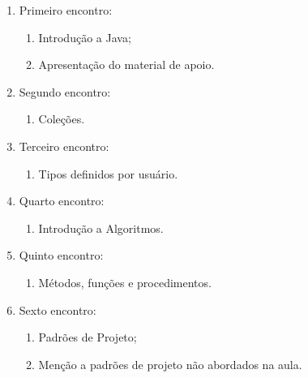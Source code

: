 \documentclass{article}
\begin{document}
\begin{enumerate}[label= (\alph*)]
    \item Primeiro encontro:
        \begin{samepage}
            \begin{enumerate}
                \item Introdução a Java;
                \item Apresentação do material de apoio.
            \end{enumerate}
        \end{samepage}
    \item Segundo encontro:
        \begin{samepage}
            \begin{enumerate}
                \item Coleções.
            \end{enumerate}
        \end{samepage}
    \item Terceiro encontro:
        \begin{samepage}
            \begin{enumerate}
                \item Tipos definidos por usuário.
            \end{enumerate}
        \end{samepage}
    \item Quarto encontro:
        \begin{samepage}
            \begin{enumerate}
                \item Introdução a Algoritmos.
            \end{enumerate}
        \end{samepage}
    \item Quinto encontro:
        \begin{samepage}
            \begin{enumerate}
                \item Métodos, funções e procedimentos.
            \end{enumerate}
        \end{samepage}
    \item Sexto encontro:
        \begin{samepage}
            \begin{enumerate}
                \item Padrões de Projeto;
                \item Menção a padrões de projeto não abordados na aula.

\end{enumerate}
\end{samepage}
\end{enumerate}
\end{document}
